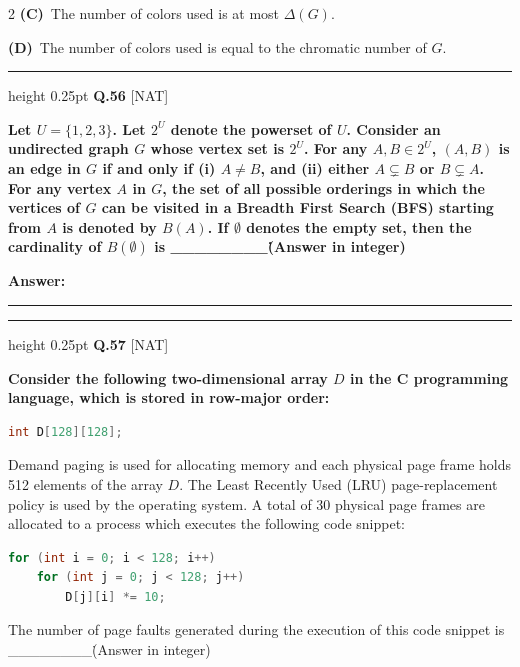 \documentclass[a4paper,10pt,twoside]{article}
\begin{document}
\begin{multicols}{2}
\textbf{(C)}~The number of colors used is at most $\Delta(G)$.\par\vspace{2pt}\noindent
\textbf{(D)}~The number of colors used is equal to the chromatic number of $G$.
\par\vspace{6pt}\hrule height 0.25pt\vspace{6pt}
\noindent\textbf{Q.56} \hfill {\footnotesize\textsf{[NAT]}}
\par\vspace{2pt}
{\bfseries Let $U = \{1, 2, 3\}$. Let $2^U$ denote the powerset of $U$. Consider an undirected graph $G$ whose vertex set is $2^U$. For any $A, B \in 2^U$, $(A, B)$ is an edge in $G$ if and only if (i) $A \neq B$, and (ii) either $A \subsetneq B$ or $B \subsetneq A$. For any vertex $A$ in $G$, the set of all possible orderings in which the vertices of $G$ can be visited in a Breadth First Search (BFS) starting from $A$ is denoted by $B(A)$.
If $\emptyset$ denotes the empty set, then the cardinality of $B(\emptyset)$ is \_\_\_\_\_\_\_\_\. (Answer in integer) \par}
\par\vspace{3pt}\noindent\textbf{Answer:} \rule{3.2cm}{0.4pt}
\par\vspace{6pt}\hrule height 0.25pt\vspace{6pt}
\noindent\textbf{Q.57} \hfill {\footnotesize\textsf{[NAT]}}
\par\vspace{2pt}
{\bfseries Consider the following two-dimensional array $D$ in the C programming language, which is stored in row-major order:
\begin{lstlisting}[language=C]
int D[128][128];
\end{lstlisting}
Demand paging is used for allocating memory and each physical page frame holds 512 elements of the array $D$. The Least Recently Used (LRU) page-replacement policy is used by the operating system. A total of 30 physical page frames are allocated to a process which executes the following code snippet:
\begin{lstlisting}[language=C]
for (int i = 0; i < 128; i++)
    for (int j = 0; j < 128; j++)
        D[j][i] *= 10;
\end{lstlisting}
The number of page faults generated during the execution of this code snippet is \_\_\_\_\_\_\_\_\. (Answer in integer) \par}

\end{multicols}
\end{document}

